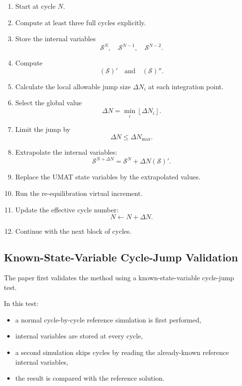 ﻿\documentclass[11pt,a4paper]{article}
\begin{document}
\begin{enumerate}[leftmargin=*]
    \item Start at cycle $N$.
    \item Compute at least three full cycles explicitly.
    \item Store the internal variables
    \[
    \bm{\mathcal{S}}^N,
    \quad
    \bm{\mathcal{S}}^{N-1},
    \quad
    \bm{\mathcal{S}}^{N-2}.
    \]
    \item Compute
    \[
    (\bm{\mathcal{S}})'
    \quad \text{and} \quad
    (\bm{\mathcal{S}})''.
    \]
    \item Calculate the local allowable jump size $\Delta N_i$ at each integration point.
    \item Select the global value
    \[
    \Delta N
    =
    \min_i
    \left\lfloor
    \Delta N_i
    \right\rfloor.
    \]
    \item Limit the jump by
    \[
    \Delta N \leq \Delta N_{\max}.
    \]
    \item Extrapolate the internal variables:
    \[
    \bm{\mathcal{S}}^{N+\Delta N}
    =
    \bm{\mathcal{S}}^N
    +
    \Delta N(\bm{\mathcal{S}})'.
    \]
    \item Replace the UMAT state variables by the extrapolated values.
    \item Run the re-equilibration virtual increment.
    \item Update the effective cycle number:
    \[
    N \leftarrow N+\Delta N.
    \]
    \item Continue with the next block of cycles.
\end{enumerate}

\subsection{Known-State-Variable Cycle-Jump Validation}

The paper first validates the method using a known-state-variable cycle-jump test.

In this test:

\begin{itemize}[leftmargin=*]
    \item a normal cycle-by-cycle reference simulation is first performed,
    \item internal variables are stored at every cycle,
    \item a second simulation skips cycles by reading the already-known reference internal variables,
    \item the result is compared with the reference solution.
\end{itemize}
\end{document}
